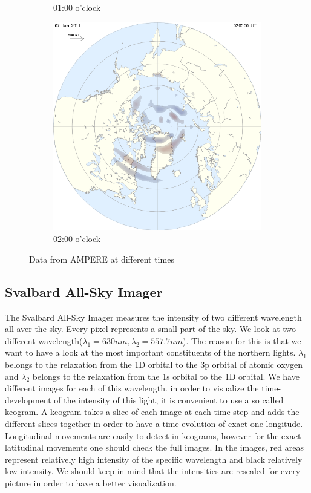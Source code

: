 \documentclass[10pt,a4paper]{article}
\begin{document}
\begin{figure}[h]
\begin{subfigure}{0.3\textwidth}
	\caption{ 01:00 o'clock \label{amp01}}
\end{subfigure}
\begin{subfigure}{0.3\textwidth}
\centering
	\includegraphics[width=\textwidth]{ampere8.png}
	\caption{ 02:00 o'clock \label{amp02}}
\end{subfigure}
\caption{Data from AMPERE at different times}
\end{figure}



\subsection{Svalbard All-Sky Imager \label{0_CHAPTER_SVALBARDIM}}

The Svalbard All-Sky Imager measures the intensity of two different wavelength all aver the sky. Every pixel represents a small part of the sky. We look at two different wavelength($\lambda_1=630 nm, \lambda_2= 557.7 nm$). The reason for this is that we want to have a look at the most important constituents of the northern lights. $\lambda_1$ belongs to the relaxation from the 1D orbital to the 3p orbital of atomic oxygen and $\lambda_2$ belongs to the relaxation from the 1s orbital to the 1D orbital. We have different images for each of this wavelength. 
in order to visualize the time-development of the intensity of this light, it is convenient to use a so called keogram. 
A keogram takes a slice of each image at each time  step and adds the different slices together in order to have a time evolution of exact one longitude. Longitudinal movements are easily to detect in keograms, however for the exact latitudinal movements one should check the full images. 
In the images, red areas represent relatively high intensity of the specific wavelength and black relatively low intensity. We should keep in mind that the intensities are rescaled for every picture in order to have a better visualization. 
\end{document}
